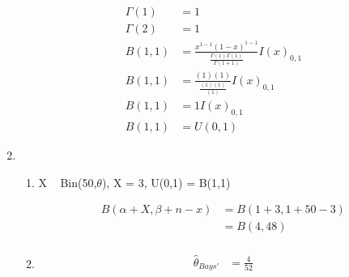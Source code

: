 \documentclass{article}
\begin{document}
\begin{enumerate}
\begin{equation*}
		\begin{split}
		\Gamma(1) & = 1 \\
		\Gamma(2) & = 1 \\
		B(1,1) & = \frac{x^{1-1}(1-x)^{1-1}}{\frac{\Gamma (1) \Gamma (1)}{\Gamma (1+1)}} I(x)_{0,1} \\
		B(1,1) & = \frac{(1)(1)}{\frac{(1)(1)}{(1)}}I(x)_{0,1} \\
		B(1,1) & = 1 I(x)_{0,1} \\
		B(1,1) & = U(0,1) 
		\end{split}
		\end{equation*}
\item
	\begin{enumerate}
	\item

 X ~ Bin(50,$\theta$), X = 3, U(0,1) = B(1,1) 

		\begin{equation*}
		\begin{split}
		B(\alpha + X, \beta + n - x) & = B(1+3, 1+50-3) \\
		& = B(4, 48) \\ 
		\end{split}
		\end{equation*}
	
	\item
		\begin{equation*}
		\begin{split}
		\hat{\theta}_{Bays'} & = \frac{4}{52} \\
		\end{split}
		\end{equation*}
	\end{enumerate}
\end{enumerate}
\end{document}
